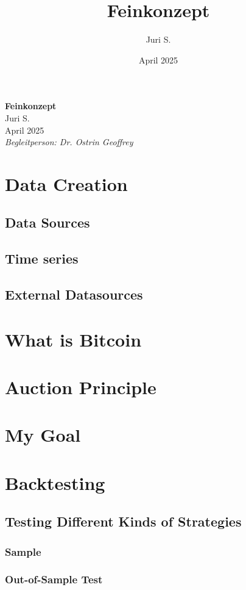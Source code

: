\documentclass{article}
\title{Feinkonzept}
\author{Juri S.}
\date{April 2025}
\begin{document}
\begin{center}
    {\large \textbf{Feinkonzept}}\\[0.5em]
    {\small Juri S.}\\
    {\small April 2025}\\[0.5em]
    \textit{Begleitperson: Dr. Ostrin Geoffrey}
\end{center}

\vspace{1em}

\section{Data Creation}
\subsection{Data Sources}
\subsection{Time series}
\subsection{External Datasources}

\section{What is Bitcoin}

\section{Auction Principle}

\section{My Goal}

\section{Backtesting}
\subsection{Testing Different Kinds of Strategies}
\subsubsection{Sample}
\subsubsection{Out-of-Sample Test}
\end{document}
